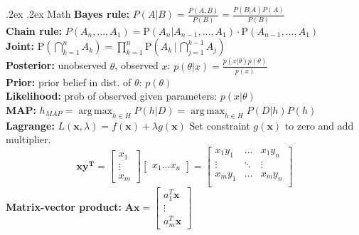 \documentclass[10pt,landscape,a4paper]{article}
\makeatletter
\DeclareMathOperator*{\argmax}{arg\,max}
\newcommand{\vek}[1]{\mathbf{#1}}
\renewcommand{\section}{\@startsection{section}{1}{0mm}%
                                {.2ex}%
                                {.2ex}%
                                {\color{myblue}\sffamily\small\bfseries}}
\makeatother
\begin{document}
\small
\begin{multicols*}{5}


\section{Math}
{\bf Bayes rule: } $P(A \vert B) = \frac{P(A, B)}{P(B)} = \frac{P(B \vert A) P(A)}{P(B)}$\\
{\bf Chain rule: } $P(A_n, \ldots , A_1)  = \mathrm P(A_n | A_{n-1}, \ldots , A_1) \cdot\mathrm P( A_{n-1}, \ldots , A_1)$\\
{\bf Joint: } $\mathrm  P\left(\bigcap_{k=1}^n A_k\right)  = \prod_{k=1}^n  \mathrm P\left(A_k \,\Bigg|\, \bigcap_{j=1}^{k-1} A_j\right)$\\
{\bf Posterior:} unobserved $\theta$, observed $x$: $p(\theta \vert x) = \frac{p(x \vert \theta)p(\theta)}{p(x)}$\\
{\bf Prior:} prior belief in dist. of $\theta$: $p(\theta)$\\
{\bf Likelihood:} prob of observed given parameters: $p(x \vert \theta)$\\
{\bf MAP:} $h_{MAP} = \argmax_{h\in H} P(h \vert D) = \argmax_{h\in H} P(D \vert h) P(h)$\\ 
{\bf Lagrange: } $L(\vek{x}, \lambda) = f(\vek{x}) + \lambda g(\vek{x})$
Set constraint $g(\vek{x})$ to zero and add multiplier. \\
$$\vek{xy^T} = \begin{bmatrix}
           x_{1} \\
           \vdots \\
           x_{m}
         \end{bmatrix}      
         \begin{bmatrix}
           x_{1}\hdots x_{n}
         \end{bmatrix} = \begin{bmatrix}
         x_1 y_1 & \hdots & x_1 y_n \\
         \vdots & \ddots  & \vdots \\
          x_m y_1 & \hdots & x_m y_n \\
         \end{bmatrix}
         $$
{\bf Matrix-vector product: } $ \vek{Ax} = \begin{bmatrix}
 	a_1^T\vek{x}\\
	\vdots \\
	a_m^T\vek{x}
	\end{bmatrix}
$


\end{multicols*}
\end{document}
